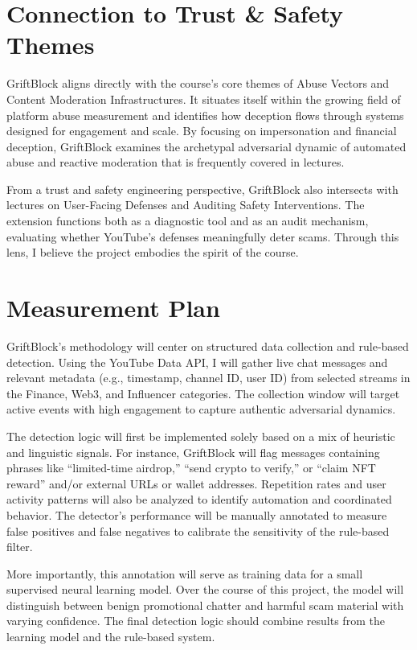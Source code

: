\documentclass[letterpaper,twocolumn,10pt]{article}
\begin{document}
\section{Connection to Trust & Safety Themes}

GriftBlock aligns directly with the course’s core themes of Abuse Vectors and Content Moderation Infrastructures. It situates itself within the growing field of platform abuse measurement and identifies how deception flows through systems designed for engagement and scale. By focusing on impersonation and financial deception, GriftBlock examines the archetypal adversarial dynamic of automated abuse and reactive moderation that is frequently covered in lectures. 

From a trust and safety engineering perspective, GriftBlock also intersects with lectures on User-Facing Defenses and Auditing Safety Interventions. The extension functions both as a diagnostic tool and as an audit mechanism, evaluating whether YouTube’s defenses meaningfully deter scams. Through this lens, I believe the project embodies the spirit of the course.

\section{Measurement Plan}

GriftBlock’s methodology will center on structured data collection and rule-based detection. Using the YouTube Data API, I will gather live chat messages and relevant metadata (e.g., timestamp, channel ID, user ID) from selected streams in the Finance, Web3, and Influencer categories. The collection window will target active events with high engagement to capture authentic adversarial dynamics.

The detection logic will first be implemented solely based on a mix of heuristic and linguistic signals. For instance, GriftBlock will flag messages containing phrases like “limited-time airdrop,” “send crypto to verify,” or “claim NFT reward” and/or external URLs or wallet addresses. Repetition rates and user activity patterns will also be analyzed to identify automation and coordinated behavior. The detector’s performance will be manually annotated to measure false positives and false negatives to calibrate the sensitivity of the rule-based filter. 

More importantly, this annotation will serve as training data for a small supervised neural learning model. Over the course of this project, the model will distinguish between benign promotional chatter and harmful scam material with varying confidence. The final detection logic should combine results from the learning model and the rule-based system.
\end{document}
